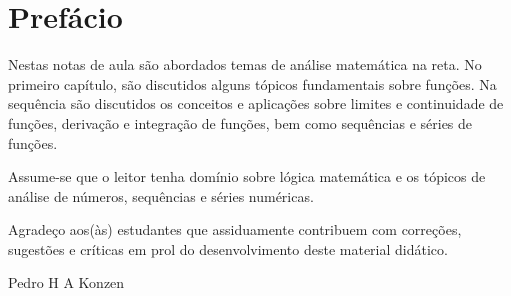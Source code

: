 

\chapter*{Prefácio}\label{prefacio}

Nestas notas de aula são abordados temas de análise matemática na reta. No primeiro capítulo, são discutidos alguns tópicos fundamentais sobre funções. Na sequência são discutidos os conceitos e aplicações sobre limites e continuidade de funções, derivação e integração de funções, bem como sequências e séries de funções.

Assume-se que o leitor tenha domínio sobre lógica matemática e os tópicos de análise de números, sequências e séries numéricas.

Agradeço aos(às) estudantes que assiduamente contribuem com correções, sugestões e críticas em prol do desenvolvimento deste material didático.

\begin{flushright}
  Pedro H A Konzen
\end{flushright}